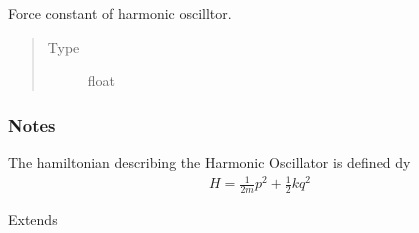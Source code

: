 \documentclass[a4paper,landscape,10pt,english]{sphinxmanual}
\begin{document}
\begin{fulllineitems}
\begin{fulllineitems}
\label{\detokenize{code_docs/simulation_api.simulation:simulation_api.simulation.simulations.HarmonicOsc1D.k}}
Force constant of harmonic oscilltor.
\begin{quote}\begin{description}
\item[{Type}] \leavevmode
float

\end{description}\end{quote}

\end{fulllineitems}

\subsubsection*{Notes}

The hamiltonian describing the Harmonic Oscillator is defined dy
\begin{equation*}
\begin{split}H = \frac{1}{2m}p^2 + \frac{1}{2}k q^2\end{split}
\end{equation*}

\begin{fulllineitems}
\label{\detokenize{code_docs/simulation_api.simulation:simulation_api.simulation.simulations.HarmonicOsc1D.__init__}}
Extends {\hyperref[\detokenize{code_docs/simulation_api.simulation:simulation_api.simulation.simulations.Simulation.__init__}]{}}


\end{fulllineitems}
\end{fulllineitems}
\end{document}
